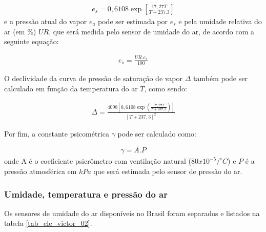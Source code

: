 			\begin{eqnarray}
				e_s = 0,6108 \exp \left[ \frac {17,27T}{T+237.3}\right]
			\end{eqnarray}
			e a pressão atual do vapor $e_a$ pode ser estimada por $e_s$ e pela umidade relativa do ar (em $\%$) $UR$, que será medida pelo sensor de umidade do ar, de acordo com a seguinte equação:

			\begin{eqnarray}
				e_s = \frac {UR.e_s}{100}
			\end{eqnarray}
			
			O declividade da curva de pressão de saturação de vapor $\Delta$ também pode ser calculado em função da temperatura do ar $T$, como sendo:

			\begin{eqnarray}
				\Delta = \frac {4098\left[ 0,6108\exp \left( \frac {17,27T}{T+237,3}\right) \right] }{\left[ T+237,3\right] ^{2}}
			\end{eqnarray}
			
			Por fim, a constante psicométrica $\gamma$ pode ser calculado como:

			\begin{eqnarray}
				\gamma = A.P
			\end{eqnarray}
			onde A é o coeficiente psicrômetro com ventilação natural ($80x10^{-5}/^{\circ}C$) e $P$ é a pressão atmosférica em $kPa$ que será estimada pelo sensor de pressão do ar.

		\subsubsection{Umidade, temperatura e pressão do ar}

			Os sensores de umidade do ar disponíveis no Brasil foram separados e listados na tabela \ref{tab_ele_victor_02}.


